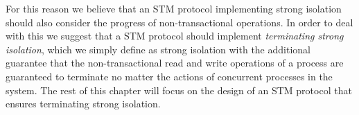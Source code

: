 For this reason we believe that an STM protocol implementing strong
isolation should also consider the progress of non-transactional operations.
In order to deal with this we suggest that a STM protocol should implement
\emph{terminating strong isolation}, which we simply define as strong isolation
with the additional guarantee that the non-transactional read and write
operations of a process are guaranteed to terminate no matter the actions of
concurrent processes in the system.
The rest of this chapter will focus on the design of an STM protocol
that ensures terminating strong isolation.








% 














